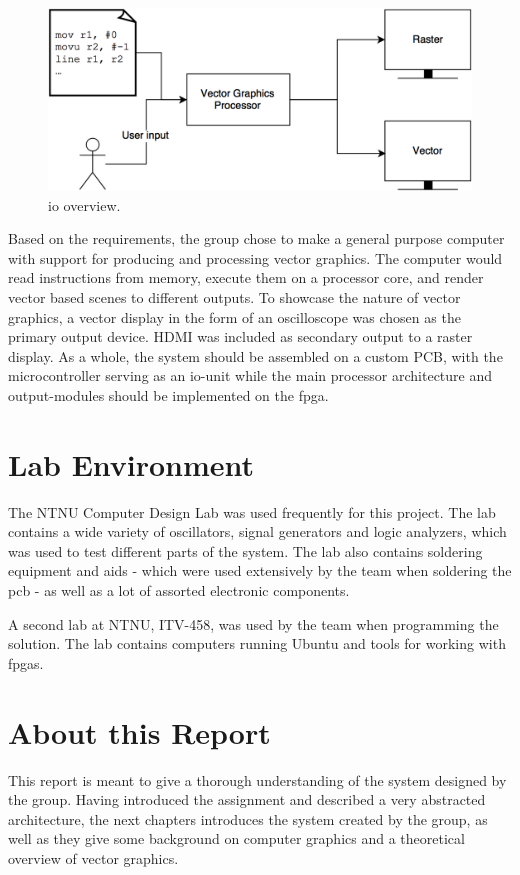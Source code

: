 \begin{figure}[H]
    \includegraphics[width=\linewidth]{images/high_level_io.png}
    \caption{\gls{io} overview.}
    \label{fig:io-overview}
\end{figure}

Based on the requirements, the group chose to make a general purpose computer with support for producing and processing vector graphics.
The computer would read instructions from memory, execute them on a processor core, and render vector based scenes to different outputs.
To showcase the nature of vector graphics, a vector display in the form of an oscilloscope was chosen as the primary output device.
HDMI was included as secondary output to a raster display.
As a whole, the system should be assembled on a custom PCB, with the microcontroller serving as an \gls{io}-unit while the main processor architecture and output-modules should be implemented on the \gls{fpga}.

\section{Lab Environment}
The NTNU Computer Design Lab was used frequently for this project.
The lab contains a wide variety of oscillators, signal generators and logic analyzers, which was used to test different parts of the system.
The lab also contains soldering equipment and aids - which were used extensively by the team when soldering the \gls{pcb} - as well as a lot of assorted electronic components.

A second lab at NTNU, ITV-458, was used by the team when programming the solution.
The lab contains computers running Ubuntu and tools for working with \gls{fpga}s.

\section{About this Report}
This report is meant to give a thorough understanding of the system designed by the group.
Having introduced the assignment and described a very abstracted architecture, the next chapters introduces the system created by the group, as well as they give some background on computer graphics and a theoretical overview of vector graphics.

